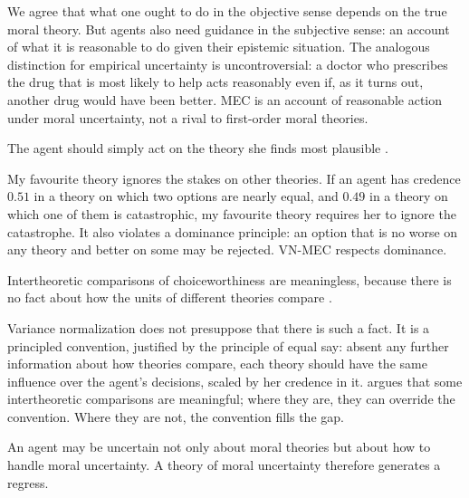 \documentclass{situationist-preprint}
\begin{document}
\begin{reply}
We agree that what one ought to do in the objective sense depends on the true moral theory. But agents also need guidance in the subjective sense: an account of what it is reasonable to do given their epistemic situation. The analogous distinction for empirical uncertainty is uncontroversial: a doctor who prescribes the drug that is most likely to help acts reasonably even if, as it turns out, another drug would have been better. MEC is an account of reasonable action under moral uncertainty, not a rival to first-order moral theories.
\end{reply}

\begin{objection}
The agent should simply act on the theory she finds most plausible \citep{GustafssonTorpman2014}.
\end{objection}

\begin{reply}
My favourite theory ignores the stakes on other theories. If an agent has credence $0.51$ in a theory on which two options are nearly equal, and $0.49$ in a theory on which one of them is catastrophic, my favourite theory requires her to ignore the catastrophe. It also violates a dominance principle: an option that is no worse on any theory and better on some may be rejected. VN-MEC respects dominance.
\end{reply}

\begin{objection}[Meaninglessness]
Intertheoretic comparisons of choiceworthiness are meaningless, because there is no fact about how the units of different theories compare \citep{Hedden2016}.
\end{objection}

\begin{reply}
Variance normalization does not presuppose that there is such a fact. It is a principled convention, justified by the principle of equal say: absent any further information about how theories compare, each theory should have the same influence over the agent's decisions, scaled by her credence in it. \citet{Tarsney2018} argues that some intertheoretic comparisons are meaningful; where they are, they can override the convention. Where they are not, the convention fills the gap.
\end{reply}

\begin{objection}[Regress]
An agent may be uncertain not only about moral theories but about how to handle moral uncertainty. A theory of moral uncertainty therefore generates a regress.
\end{objection}
\end{document}
